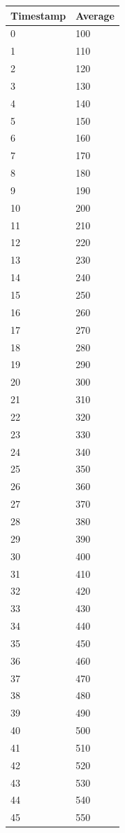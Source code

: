 %
%
\begin{tabular}{|l||l|}
\hline
	\textbf{Timestamp} & \textbf{Average} \\ \hline
	0 & 100 \\ \hline
	1 & 110 \\ \hline
	2 & 120 \\ \hline
	3 & 130 \\ \hline
	4 & 140 \\ \hline
	5 & 150 \\ \hline
	6 & 160 \\ \hline
	7 & 170 \\ \hline
	8 & 180 \\ \hline
	9 & 190 \\ \hline
	10 & 200 \\ \hline
	11 & 210 \\ \hline
	12 & 220 \\ \hline
	13 & 230 \\ \hline
	14 & 240 \\ \hline
	15 & 250 \\ \hline
	16 & 260 \\ \hline
	17 & 270 \\ \hline
	18 & 280 \\ \hline
	19 & 290 \\ \hline
	20 & 300 \\ \hline
	21 & 310 \\ \hline
	22 & 320 \\ \hline
	23 & 330 \\ \hline
	24 & 340 \\ \hline
	25 & 350 \\ \hline
	26 & 360 \\ \hline
	27 & 370 \\ \hline
	28 & 380 \\ \hline
	29 & 390 \\ \hline
	30 & 400 \\ \hline
	31 & 410 \\ \hline
	32 & 420 \\ \hline
	33 & 430 \\ \hline
	34 & 440 \\ \hline
	35 & 450 \\ \hline
	36 & 460 \\ \hline
	37 & 470 \\ \hline
	38 & 480 \\ \hline
	39 & 490 \\ \hline
	40 & 500 \\ \hline
	41 & 510 \\ \hline
	42 & 520 \\ \hline
	43 & 530 \\ \hline
	44 & 540 \\ \hline
	45 & 550 \\ \hline
\end{tabular}
